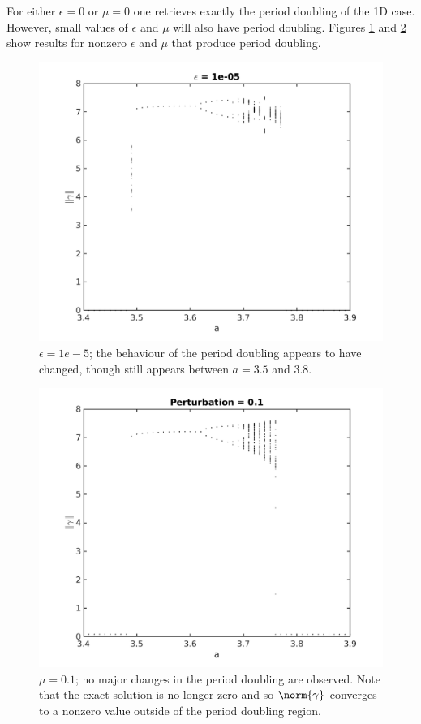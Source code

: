 \documentclass{article}
\begin{document}
For either $\epsilon = 0$ or $\mu = 0$ one retrieves exactly the period doubling of the 1D case.
However, small values of $\epsilon$ and $\mu$ will also have period doubling.
Figures \ref{fig:exp15_04} and \ref{fig:exp15_06} show results for nonzero $\epsilon$ and $\mu$ that produce period doubling.

\begin{figure}
	\includegraphics[width=\textwidth]{exp15_04.png}
	\caption{$\epsilon = 1e-5$; the behaviour of the period doubling appears to have changed, though still appears between $a=3.5$ and 3.8.}
	\label{fig:exp15_04}
\end{figure}

\begin{figure}
	\includegraphics[width=\textwidth]{exp15_06.png}
	\caption{$\mu = 0.1$; no major changes in the period doubling are observed. Note that the exact solution is no longer zero and so $\norm{\gamma}$ converges to a nonzero value outside of the period doubling region.}
	\label{fig:exp15_06}
\end{figure}
\end{document}
